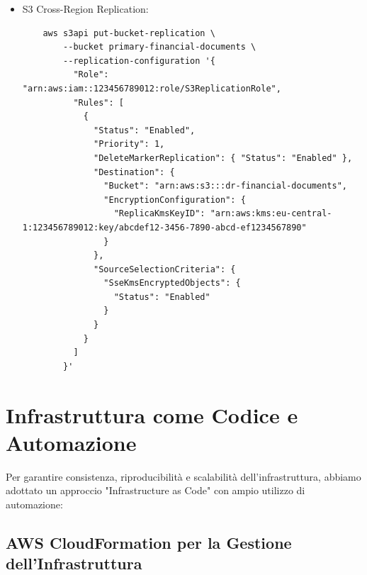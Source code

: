 \documentclass[a4paper,12pt]{report}
\begin{document}
\begin{itemize}
\begin{itemize}
    \item S3 Cross-Region Replication:
    \begin{verbatim}
    aws s3api put-bucket-replication \
        --bucket primary-financial-documents \
        --replication-configuration '{
          "Role": "arn:aws:iam::123456789012:role/S3ReplicationRole",
          "Rules": [
            {
              "Status": "Enabled",
              "Priority": 1,
              "DeleteMarkerReplication": { "Status": "Enabled" },
              "Destination": {
                "Bucket": "arn:aws:s3:::dr-financial-documents",
                "EncryptionConfiguration": {
                  "ReplicaKmsKeyID": "arn:aws:kms:eu-central-1:123456789012:key/abcdef12-3456-7890-abcd-ef1234567890"
                }
              },
              "SourceSelectionCriteria": {
                "SseKmsEncryptedObjects": {
                  "Status": "Enabled"
                }
              }
            }
          ]
        }'
    \end{verbatim}
\end{itemize}
\end{itemize}

\section{Infrastruttura come Codice e Automazione}

Per garantire consistenza, riproducibilità e scalabilità dell'infrastruttura, abbiamo adottato un approccio "Infrastructure as Code" con ampio utilizzo di automazione:

\subsection{AWS CloudFormation per la Gestione dell'Infrastruttura}
\end{document}

